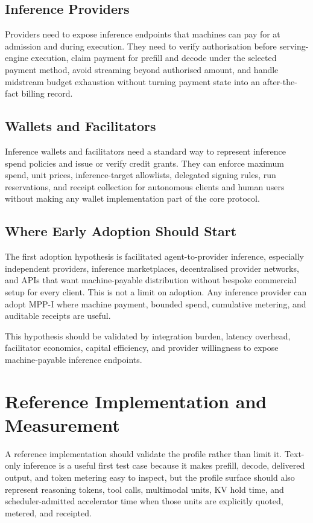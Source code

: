 \documentclass[11pt]{article}
\newcommand{\mppi}{MPP-I}
\begin{document}
\subsection{Inference Providers}

Providers need to expose inference endpoints that machines can pay for at admission and during execution. They need to verify authorisation before serving-engine execution, claim payment for prefill and decode under the selected payment method, avoid streaming beyond authorised amount, and handle midstream budget exhaustion without turning payment state into an after-the-fact billing record.

\subsection{Wallets and Facilitators}

Inference wallets and facilitators need a standard way to represent inference spend policies and issue or verify credit grants. They can enforce maximum spend, unit prices, inference-target allowlists, delegated signing rules, run reservations, and receipt collection for autonomous clients and human users without making any wallet implementation part of the core protocol.

\subsection{Where Early Adoption Should Start}

The first adoption hypothesis is facilitated agent-to-provider inference, especially independent providers, inference marketplaces, decentralised provider networks, and APIs that want machine-payable distribution without bespoke commercial setup for every client. This is not a limit on adoption. Any inference provider can adopt \mppi{} where machine payment, bounded spend, cumulative metering, and auditable receipts are useful.

This hypothesis should be validated by integration burden, latency overhead, facilitator economics, capital efficiency, and provider willingness to expose machine-payable inference endpoints.

\section{Reference Implementation and Measurement}

A reference implementation should validate the profile rather than limit it. Text-only inference is a useful first test case because it makes prefill, decode, delivered output, and token metering easy to inspect, but the profile surface should also represent reasoning tokens, tool calls, multimodal units, KV hold time, and scheduler-admitted accelerator time when those units are explicitly quoted, metered, and receipted.
\end{document}
